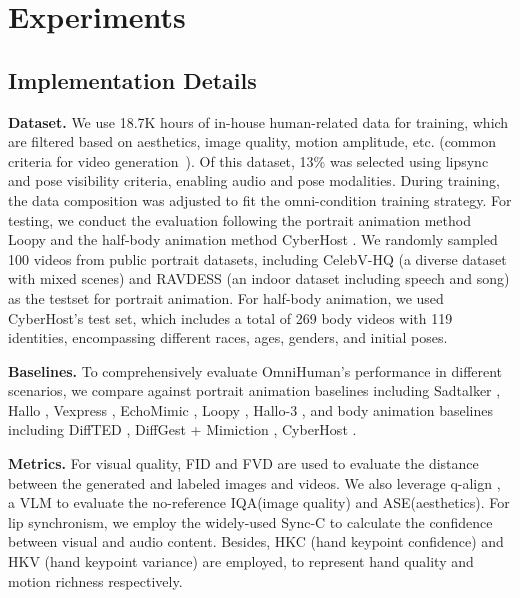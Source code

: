 \section{Experiments}
\subsection{Implementation Details}
  \textbf{Dataset.} We use 18.7K hours of in-house human-related data for training, which are filtered based on aesthetics, image quality, motion amplitude, etc. (common criteria for video generation~\cite{chen2024panda}). Of this dataset, 13\% was selected using lipsync and pose visibility criteria, enabling audio and pose modalities. During training, the data composition was adjusted to fit the omni-condition training strategy. For testing, we conduct the evaluation following the portrait animation method Loopy \cite{jiang2024loopy} and the half-body animation method CyberHost \cite{lin2025cyberhost}. We randomly sampled 100 videos from public portrait datasets, including CelebV-HQ \cite{zhu2022celebv} (a diverse dataset with mixed scenes) and RAVDESS \cite {ravdess_dataset} (an indoor dataset including speech and song) as the testset for portrait animation. For half-body animation, we used CyberHost's test set, which includes a total of 269 body videos with 119 identities, encompassing different races, ages, genders, and initial poses.


  \textbf{Baselines.} To comprehensively evaluate OmniHuman's performance in different scenarios, we compare against portrait animation baselines including Sadtalker \cite{zhang2023sadtalker}, Hallo \cite{xu2024hallo}, Vexpress \cite{wang2024vexpress}, EchoMimic \cite{chen2024echomimic}, Loopy \cite{jiang2024loopy}, Hallo-3 \cite{hallo3}, and body animation baselines including DiffTED \cite{diffted}, DiffGest \cite{zhu2023taming} + Mimiction \cite{zhang2024mimicmotion}, CyberHost \cite{lin2025cyberhost}. 

  \textbf{Metrics.} For visual quality, FID \cite{heusel2017gans} and FVD \cite{unterthiner2019fvd} are used to evaluate the distance between the generated and labeled images and videos. We also leverage q-align \cite{wu2023q}, a VLM to evaluate the no-reference IQA(image quality) and ASE(aesthetics). For lip synchronism, we employ the widely-used Sync-C \cite{syncnet} to calculate the confidence between visual and audio content. Besides, HKC (hand keypoint confidence) \cite{lin2025cyberhost} and HKV (hand keypoint variance) \cite{lin2025cyberhost} are employed, to represent hand quality and motion richness respectively. 
  \par

